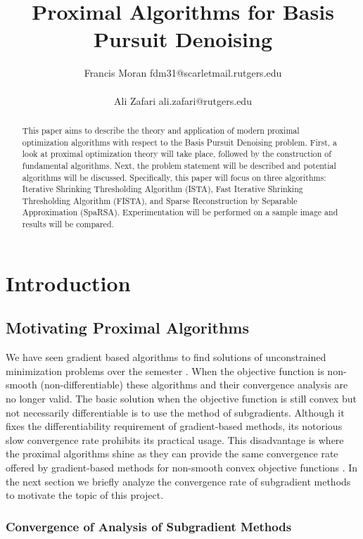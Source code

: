 \documentclass[10pt]{article} %
\title{Proximal Algorithms for Basis Pursuit Denoising}
\author{\name 
    Francis Moran\email
    fdm31@scarletmail.rutgers.edu\\\\
    \name 
    Ali Zafari
    \email
    ali.zafari@rutgers.edu
}
\begin{document}
\maketitle

\begin{abstract}
This paper aims to describe the theory and application of modern proximal optimization algorithms with respect to the Basis Pursuit Denoising problem. First, a look at proximal optimization theory will take place, followed by the construction of fundamental algorithms. Next, the problem statement will be described and potential algorithms will be discussed. Specifically, this paper will focus on three algorithms: Iterative Shrinking Thresholding Algorithm (ISTA), Fast Iterative Shrinking Thresholding Algorithm (FISTA), and Sparse Reconstruction by Separable Approximation (SpaRSA). Experimentation will be performed on a sample image and results will be compared.
\end{abstract}

\section{Introduction}
\subsection{Motivating Proximal Algorithms}
We have seen gradient based algorithms to find solutions of unconstrained minimization problems over the semester \citep{boyd2004convex}. When the objective function is non-smooth (non-differentiable) these algorithms and their convergence analysis are no longer valid. The basic solution when the objective function is still convex but not necessarily differentiable is to use the method of subgradients. Although it fixes the differentiability requirement of gradient-based methods, its notorious slow convergence rate prohibits its practical usage. This disadvantage is where the proximal algorithms shine as they can provide the same convergence rate offered by gradient-based methods for non-smooth convex objective functions \citep{parikh2014proximal}. In the next section we briefly analyze the convergence rate of subgradient methods to motivate the topic of this project.

\subsubsection{Convergence of Analysis of Subgradient Methods}
\end{document}
